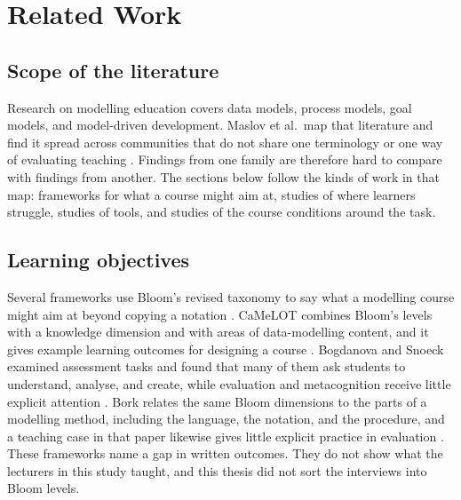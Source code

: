 
%

\chapter{Related Work}
\label{cha:related_work}

\section{Scope of the literature}
\label{sec:rw_landscape}

Research on modelling education covers data models, process models, goal models, and model-driven development. Maslov et al.\ map that literature and find it spread across communities that do not share one terminology or one way of evaluating teaching \cite{maslov2025conceptual}. Findings from one family are therefore hard to compare with findings from another. The sections below follow the kinds of work in that map: frameworks for what a course might aim at, studies of where learners struggle, studies of tools, and studies of the course conditions around the task.

\section{Learning objectives}
\label{sec:rw_frameworks}

Several frameworks use Bloom's revised taxonomy to say what a modelling course might aim at beyond copying a notation \cite{krathwohl2002revision}. CaMeLOT combines Bloom's levels with a knowledge dimension and with areas of data-modelling content, and it gives example learning outcomes for designing a course \cite{bogdanova2019camelot}. Bogdanova and Snoeck examined assessment tasks and found that many of them ask students to understand, analyse, and create, while evaluation and metacognition receive little explicit attention \cite{bogdanova2017domain}. Bork relates the same Bloom dimensions to the parts of a modelling method, including the language, the notation, and the procedure, and a teaching case in that paper likewise gives little explicit practice in evaluation \cite{bork2019framework}. These frameworks name a gap in written outcomes. They do not show what the lecturers in this study taught, and this thesis did not sort the interviews into Bloom levels.

